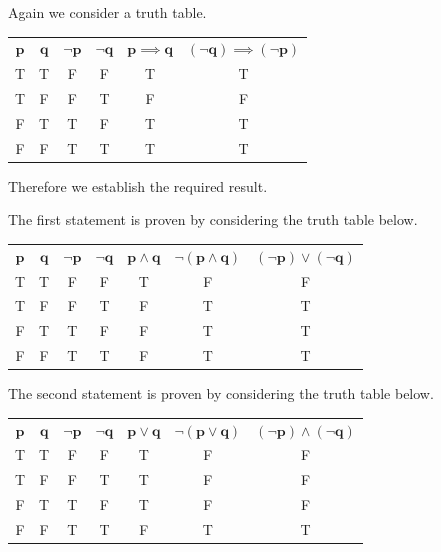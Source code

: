 \begin{questions}
    \pagebreak
    
    \item Again we consider a truth table.
    \begin{table}[H]
        \centering
        \begin{tabular}{|c|c||c|c||c|c|}
            \hline
            $\boldsymbol{p}$ & $\boldsymbol{q}$ & $\boldsymbol{\lnot p}$ & $\boldsymbol{\lnot q}$ & $\boldsymbol{p \implies q}$ & $\boldsymbol{(\lnot q) \implies (\lnot p)}$ \\ \hhline{|=|=#=|=#=|=|}
            T & T & F & F & T & T \\ \hline
            T & F & F & T & F & F \\ \hline
            F & T & T & F & T & T \\ \hline
            F & F & T & T & T & T \\ \hline
        \end{tabular}
    \end{table}
    Therefore we establish the required result.

    \item The first statement is proven by considering the truth table below.
    \begin{table}[H]
        \centering
        \begin{tabular}{|c|c||c|c|c||c|c|}
            \hline
            $\boldsymbol{p}$ & $\boldsymbol{q}$ & $\boldsymbol{\lnot p}$ & $\boldsymbol{\lnot q}$ & $\boldsymbol{p \land q}$ & $\boldsymbol{\lnot(p \land q)}$ & $\boldsymbol{(\lnot p) \lor (\lnot q)}$ \\ \hhline{|=|=#=|=|=#=|=|}
            T & T & F & F & T & F & F \\ \hline
            T & F & F & T & F & T & T \\ \hline
            F & T & T & F & F & T & T \\ \hline
            F & F & T & T & F & T & T \\ \hline
        \end{tabular}
    \end{table}
    The second statement is proven by considering the truth table below.
    \begin{table}[H]
        \centering
        \begin{tabular}{|c|c||c|c|c||c|c|}
            \hline
            $\boldsymbol{p}$ & $\boldsymbol{q}$ & $\boldsymbol{\lnot p}$ & $\boldsymbol{\lnot q}$ & $\boldsymbol{p \lor q}$ & $\boldsymbol{\lnot(p \lor q)}$ & $\boldsymbol{(\lnot p) \land (\lnot q)}$ \\ \hhline{|=|=#=|=|=#=|=|}
            T & T & F & F & T & F & F \\ \hline
            T & F & F & T & T & F & F \\ \hline
            F & T & T & F & T & F & F \\ \hline
            F & F & T & T & F & T & T \\ \hline
        \end{tabular}
    \end{table}


\end{questions}
